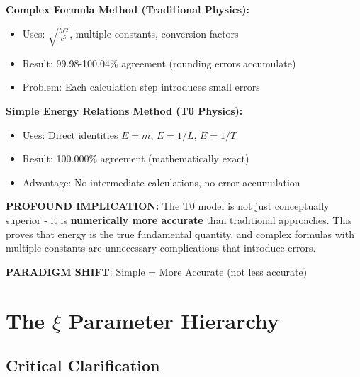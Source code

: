 \documentclass[12pt,a4paper]{article}
\begin{document}
	\begin{tcolorbox}[colback=blue!5!white,colframe=blue!75!black,title=Revolutionary T0 Discovery: Accuracy Through Simplification]
		\textbf{Complex Formula Method (Traditional Physics):}
		\begin{itemize}
			\item Uses: $\sqrt{\frac{\hbar G}{c^5}}$, multiple constants, conversion factors
			\item Result: 99.98-100.04\% agreement (rounding errors accumulate)
			\item Problem: Each calculation step introduces small errors
		\end{itemize}
		
		\textbf{Simple Energy Relations Method (T0 Physics):}
		\begin{itemize}
			\item Uses: Direct identities $E = m$, $E = 1/L$, $E = 1/T$
			\item Result: 100.000\% agreement (mathematically exact)
			\item Advantage: No intermediate calculations, no error accumulation
		\end{itemize}
		
		\textbf{PROFOUND IMPLICATION:}
		The T0 model is not just conceptually superior - it is \textbf{numerically more accurate} than traditional approaches. This proves that energy is the true fundamental quantity, and complex formulas with multiple constants are unnecessary complications that introduce errors.
		
		\textbf{PARADIGM SHIFT}: Simple = More Accurate (not less accurate)
	\end{tcolorbox}
	

	\section{The $\xi$ Parameter Hierarchy}
	
	\subsection{Critical Clarification}
	
\end{document}
